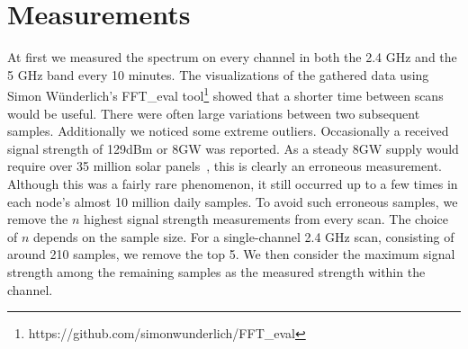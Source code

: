 \documentclass[a4paper, 11pt]{article}
\begin{document}
\section{Measurements}


At first we measured the spectrum on every channel in both the 2.4 GHz and the 5 GHz band every 10 minutes. The visualizations of the gathered data using Simon W{\"u}nderlich's FFT\_eval tool\footnote{https://github.com/simonwunderlich/FFT\_eval} showed that a shorter time between scans would be useful. There were often large variations between two subsequent samples. Additionally we noticed some extreme outliers. Occasionally a received signal strength of 129dBm or 8GW was reported. As a steady 8GW supply would require over 35 million solar panels~\cite{gigawatt}, this is clearly an erroneous measurement. Although this was a fairly rare phenomenon, it still occurred up to a few times in each node's almost 10 million daily samples. To avoid such erroneous samples, we remove the $n$ highest signal strength measurements from every scan. The choice of $n$ depends on the sample size. For a single-channel 2.4 GHz scan, consisting of around 210 samples, we remove the top 5. We then consider the maximum signal strength among the remaining samples as the measured strength within the channel. \\
\end{document}
